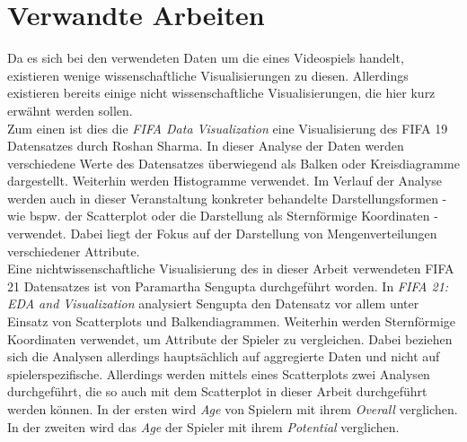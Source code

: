 \documentclass[usegeometry=true]{scrartcl}
\begin{document}
\section{Verwandte Arbeiten}

Da es sich bei den verwendeten Daten um die eines Videospiels handelt, existieren wenige wissenschaftliche Visualisierungen zu diesen. Allerdings existieren bereits einige nicht wissenschaftliche Visualisierungen, die hier kurz erwähnt werden sollen.\\
Zum einen ist dies die \textit{FIFA Data Visualization}\cite{ roshan_fifa_nodate} eine Visualisierung des FIFA 19 Datensatzes durch Roshan Sharma. In dieser Analyse der Daten werden verschiedene Werte des Datensatzes überwiegend als Balken oder Kreisdiagramme dargestellt. Weiterhin werden Histogramme verwendet. Im Verlauf der Analyse werden auch in dieser Veranstaltung konkreter behandelte Darstellungsformen - wie bspw. der Scatterplot oder die Darstellung als Sternförmige Koordinaten - verwendet. Dabei liegt der Fokus auf der Darstellung von Mengenverteilungen verschiedener Attribute.\\
Eine nichtwissenschaftliche Visualisierung des in dieser Arbeit verwendeten FIFA 21 Datensatzes ist von Paramartha Sengupta durchgeführt worden. In \textit{FIFA 21: EDA and Visualization}\cite{sengupta_fifa_nodate} analysiert Sengupta den Datensatz vor allem unter Einsatz von Scatterplots und Balkendiagrammen. Weiterhin werden Sternförmige Koordinaten verwendet, um Attribute der Spieler zu vergleichen. Dabei beziehen sich die Analysen allerdings hauptsächlich auf aggregierte Daten und nicht auf spielerspezifische.
Allerdings werden mittels eines Scatterplots zwei Analysen durchgeführt, die so auch mit dem Scatterplot in dieser Arbeit durchgeführt werden können. In der ersten wird \textit{Age} von Spielern mit ihrem \textit{Overall} verglichen. In der zweiten wird das \textit{Age} der Spieler mit ihrem \textit{Potential} verglichen.\\
\end{document}
